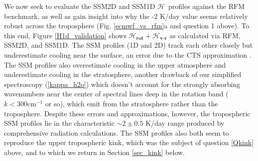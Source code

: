 \documentclass{ametsoc}
\newcommand{\eqnref}[1]{(\ref{#1})}
\newcommand{\cminverse}{\ensuremath{\mathrm{cm^{-1}}}}
\newcommand{\ch}{\ensuremath{\mathcal{H}}}
\newcommand{\tauk}{\ensuremath{\tau_k}}
\newcommand{\vr}{\ensuremath{\textbf{v-r}}}
\newcommand{\rot}{\ensuremath{\textbf{rot}}}
\begin{document}
  We now seek to evaluate  the SSM2D and SSM1D  \ch\ profiles against the RFM benchmark, as well as gain insight into why the -2 K/day value seems relatively robust across the troposphere (Fig. \ref{ecmwf_vs_rfm}a and question 1 above). To this end,  Figure \ref{H1d_validation} shows  $\ch_{\rot} + \ch_{\vr}$ as calculated via RFM, SSM2D, and SSM1D.  The SSM profiles (1D and 2D) track each other closely but  underestimate cooling near the surface, an error due to the CTS approximation \citep[][]{jeevanjee2019b}.  The SSM profiles also overestimate cooling in the upper atmosphere and underestimate cooling in the stratosphere, another drawback of our simplified spectroscopy \eqnref{kappa_h2o} which doesn't account for the strongly absorbing wavenumbers near the center of spectral lines deep in the rotation band ($k<300 \cminverse$ or so), which emit from the stratosphere rather than the troposphere.  Despite these errors and approximations, however, the  tropospheric SSM profiles lie in the characteristic $\sim 2 \pm 0.5 $ K/day range produced by comprehensive radiation calculations. The SSM profiles also both seem to reproduce the upper tropospheric kink, which was the subject of question \ref{Qkink} above, and to which we return in  Section \ref{sec_kink} below.

 
\end{document}
